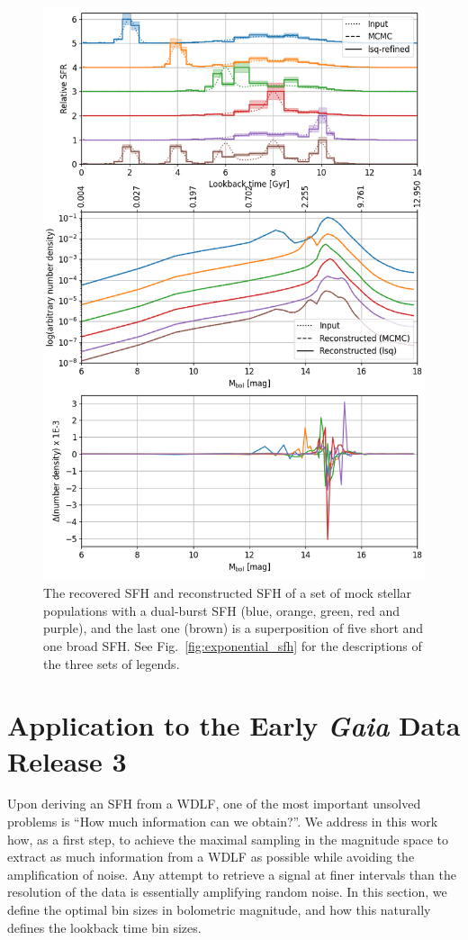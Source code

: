 \documentclass[fleqn,usenatbib]{mnras}
\begin{document}
\begin{figure}
  \includegraphics[width=\columnwidth]{figures/fig_02_two_bursts_wdlf.png} 
  \caption{The recovered SFH and reconstructed SFH of a set of mock stellar
  populations with a dual-burst SFH (blue, orange, green, red and purple), and
  the last one (brown) is a superposition of five short and one broad SFH.
  See Fig.~\ref{fig:exponential_sfh} for the descriptions of the three sets
  of legends.}
  \label{fig:bursts_sfh}
\end{figure}


\section{Application to the Early \textit{Gaia} Data Release 3}
\label{sec:application}
Upon deriving an SFH from a WDLF, one of the most important unsolved problems
is ``How much information can we obtain?''. We address in this work how, as a
first step, to achieve the maximal sampling in the magnitude space to extract
as much information from a WDLF as possible while avoiding the amplification of
noise. Any attempt to retrieve a signal at finer intervals than the
resolution of the data is essentially amplifying random noise. In this section,
we define the optimal bin sizes in bolometric magnitude, and how this naturally
defines the lookback time bin sizes.
\end{document}
